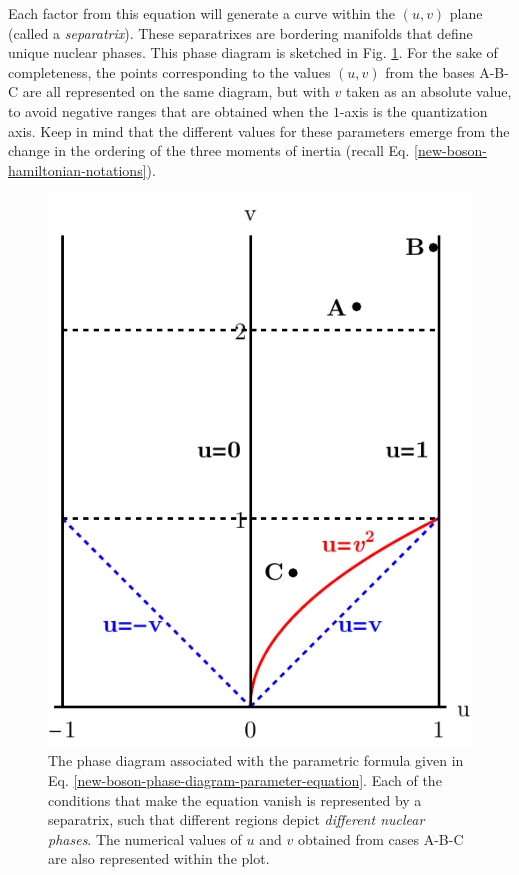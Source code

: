 Each factor from this equation will generate a curve within the $(u,v)$ plane (called a \emph{separatrix}). These separatrixes are bordering manifolds that define unique nuclear phases. This phase diagram is sketched in Fig. \ref{separatrix-diagram}. For the sake of completeness, the points corresponding to the values $(u,v)$ from the bases A-B-C are all represented on the same diagram, but with $v$ taken as an absolute value, to avoid negative ranges that are obtained when the $1$-axis is the quantization axis. Keep in mind that the different values for these parameters emerge from the change in the ordering of the three moments of inertia (recall Eq. \ref{new-boson-hamiltonian-notations}).
\begin{figure}
    \centering
    \includegraphics[scale=1]{Chapters/Figures/new-boson-separatrix-diagram.pdf}
    \caption{The phase diagram associated with the parametric formula given in Eq. \ref{new-boson-phase-diagram-parameter-equation}. Each of the conditions that make the equation vanish is represented by a separatrix, such that different regions depict \emph{different nuclear phases}. The numerical values of $u$ and $v$ obtained from cases A-B-C are also represented within the plot.}
    \label{separatrix-diagram}
\end{figure}


